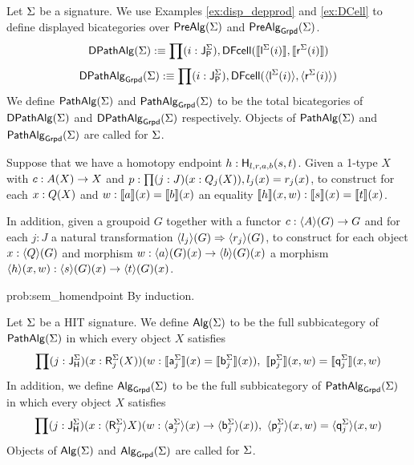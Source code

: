 \begin{definition}
\label{def:pathalg}
Let $\sign$ be a signature.
We use Examples \ref{ex:disp_depprod} and \ref{ex:DCell} to define displayed bicategories over $\prealg{\sign}$ and $\prealgG{\sign}$.
\[
\pathalgMD(\sign) \eqdef \depprod{(i : \pathlabel[\sign])}{\DCell(\semE{\pathleft[\sign](i)},\semE{\pathright[\sign](i)})}
\]
\[
\pathalgGD{\sign} \eqdef \depprod{(i : \pathlabel[\sign])}{\DCell(\semEG{\pathleft[\sign](i)},\semEG{\pathright[\sign](i)})}
\]
We define $\pathalgM(\sign)$ and $\pathalgG{\sign}$ to be the total bicategories of $\pathalgMD(\sign)$ and $\pathalgGD{\sign}$ respectively.
Objects of $\pathalgM(\sign)$ and $\pathalgG{\sign}$ are called  for $\sign$.
\end{definition}

\begin{problem}
\label{prob:sem_homendpoint}
Suppose that we have a homotopy endpoint $h : \homotendpoint{l}{r}{a}{b}{s}{t}$.
Given a 1-type $X$ with $c : \polyAct{A}{X} \rightarrow X$ and $p : \depprod{(j : J) (x : \polyAct{Q_j}{X})}{l_j(x) = r_j(x)}$,
to construct for each $x : \polyAct{Q}{X}$ and $w : \semE{a}(x) = \semE{b}(x)$
an equality $\semH{h}(x, w) : \semE{s}(x) = \semE{t}(x)$.

In addition, given a groupoid $G$ together with a functor $c : \semPG{A}{(G)} \rightarrow G$ and for each $j : J$ a natural transformation $\semEG{l_j}(G) \twocell \semEG{r_j}(G)$,
to construct for each object $x : \semPG{Q}{(G)}$ and morphism $w : \semEG{a}(G)(x) \rightarrow \semEG{b}(G)(x)$
a morphism $\semHG{h}(x, w) : \semEG{s}(G)(x) \rightarrow \semEG{t}(G)(x)$.
\end{problem}

\begin{construction}{prob:sem_homendpoint}
By induction.
\end{construction}

\begin{definition}
\label{def:bicat_grpd}
Let $\sign$ be a HIT signature.
We define $\algM(\sign)$ to be the full subbicategory of $\pathalgM(\sign)$
in which every object $X$ satisfies
\begin{equation*}
\begin{split}
\prod
(j : \homotlabel[\sign]) (x : \polyAct{\homotpointarg[\sign]_j}{X}) (w : \semE{\pathargleft[\sign]_j}(x) = \semE{\pathargright[\sign]_j}(x)),
\ \semH{\homotleft[\sign]_j}(x, w) = \semH{\homotright[\sign]_j}(x, w)
\end{split}
\end{equation*}
In addition, we define $\algG{\sign}$ to be the full subbicategory of $\pathalgG{\sign} $
in which every object $X$ satisfies
\begin{equation*}
\begin{split}
\prod
(j : \homotlabel[\sign]) (x : \semPG{\homotpointarg[\sign]_j}{X}) (w : \semEG{\pathargleft[\sign]_j}(x) \rightarrow \semEG{\pathargright[\sign]_j}(x)),\
\semHG{\homotleft[\sign]_j}(x, w) = \semHG{\homotright[\sign]_j}(x, w)
\end{split}
\end{equation*}
Objects of $\algM(\sign)$ and $\algG{\sign}$ are called  for $\sign$.
\end{definition}

